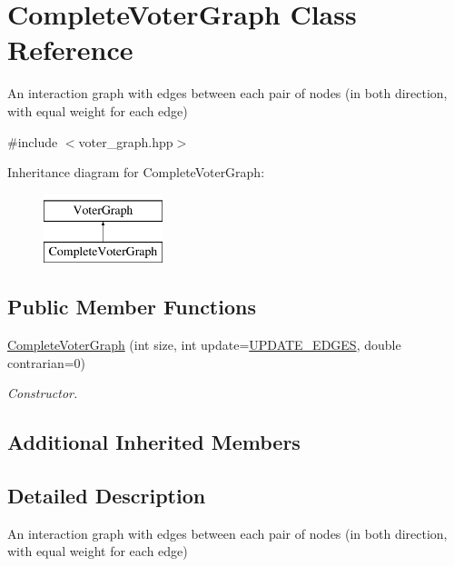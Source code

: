 \hypertarget{classCompleteVoterGraph}{\section{Complete\-Voter\-Graph Class Reference}
\label{classCompleteVoterGraph}
}


An interaction graph with edges between each pair of nodes (in both direction, with equal weight for each edge)  




{\ttfamily \#include $<$voter\-\_\-graph.\-hpp$>$}

Inheritance diagram for Complete\-Voter\-Graph\-:\begin{figure}[H]
\begin{center}
\leavevmode
\includegraphics[height=2.000000cm]{classCompleteVoterGraph}
\end{center}
\end{figure}
\subsection*{Public Member Functions}
\begin{DoxyCompactItemize}
\item 
\hyperlink{classCompleteVoterGraph_a0adf42ee4826aa54e1a13d9b8d770554}{Complete\-Voter\-Graph} (int size, int update=\hyperlink{voter__graph_8hpp_ab3bec55c359e4ed771339c8bc61fc35aa01d100088352e1a7d3a34c9a66d0f951}{U\-P\-D\-A\-T\-E\-\_\-\-E\-D\-G\-E\-S}, double contrarian=0)
\begin{DoxyCompactList}\small\item\em Constructor. \end{DoxyCompactList}\end{DoxyCompactItemize}
\subsection*{Additional Inherited Members}


\subsection{Detailed Description}
An interaction graph with edges between each pair of nodes (in both direction, with equal weight for each edge) 

